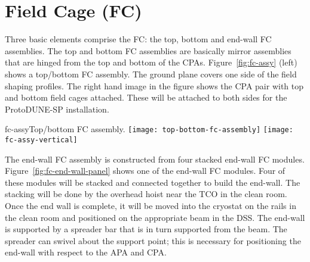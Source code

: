 


\section{Field Cage (FC)}


Three basic elements comprise the FC: the top, bottom and end-wall FC assemblies.  
The top and bottom FC assemblies are basically mirror assemblies that are hinged from the top and bottom of the CPAs. %
Figure~\ref{fig:fc-assy} (left) shows a top/bottom FC assembly.  
The ground plane covers one side of the field shaping profiles.  
The right hand image in the figure shows the CPA pair with top and bottom field cages attached.
These will be attached to both sides for the ProtoDUNE-SP installation.  
\begin{cdrfigure}{fc-assy}{Top/bottom FC assembly. }
\texttt{[image: top-bottom-fc-assembly]}
\texttt{[image: fc-assy-vertical]}
\end{cdrfigure}

The end-wall FC assembly is constructed from four stacked end-wall FC modules.  Figure~\ref{fig:fc-end-wall-panel} shows one of the end-wall FC modules.  Four of these modules will be stacked and connected together to build the end-wall.  
The stacking will be done by the overhead hoist near the TCO in the clean room.  Once the end wall is complete, it will be moved into the cryostat on the rails in the clean room and positioned on the appropriate beam in the DSS. 
The end-wall is supported by a spreader bar that is in turn supported from the beam. The spreader can swivel about the support point;  this is necessary for positioning the end-wall with respect to the APA and CPA. %

